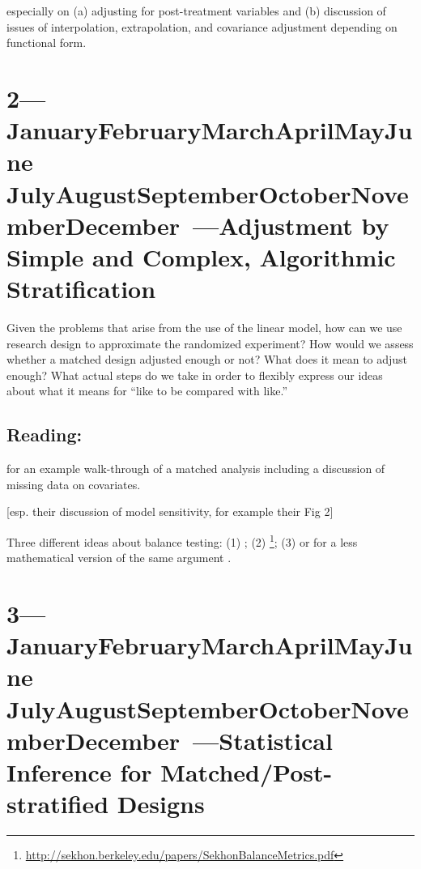 \documentclass[10pt]{article}
\def\themonth{\ifcase\month\or
  January\or February\or March\or April\or May\or June\or
  July\or August\or September\or October\or November\or December\fi}
\begin{document}
\citet[Chap 9 and 10]{gelman2007dau} especially on (a) adjusting for
post-treatment variables and (b) discussion of issues of
interpolation, extrapolation, and covariance adjustment depending on
functional form.



\citealp[Chap 1 and 2]{gerber2012field}

\citealp{holland:1986a}




\AdvanceDate[1]
\section{2---\themonth~\the\day---Adjustment by Simple and Complex, Algorithmic Stratification }

Given the problems that arise from the use of the linear model, how can we use
research design to approximate the randomized experiment? How would we assess
whether a matched design adjusted enough or not? What does it mean to adjust
enough? What actual steps do we take in order to flexibly express our ideas
about what it means for ``like to be compared with like.''

\subsection{Reading:}

\citet[Chap 8--9,13]{rosenbaum2010design}

\cite{hansen:2004a}

\cite{hansen2011qy} for an example walk-through of a matched analysis
including a discussion of missing data on covariates.

\cite{ho2007man} [esp. their discussion of model sensitivity, for
example their Fig 2] 

Three different ideas about balance testing: (1) \cite{imai2008mae}; (2)
\cite{sekhon2007alternative}\footnote{
  \url{http://sekhon.berkeley.edu/papers/SekhonBalanceMetrics.pdf}}; (3)
\cite{hansen2008cbs} \cite{hansen:statmed:2008} or for a less mathematical
version of the same argument \cite[\S 3]{bowers2011mem}.



\AdvanceDate[1]
\section{3---\themonth~\the\day---Statistical Inference for
  Matched/Post-stratified Designs}
\end{document}
